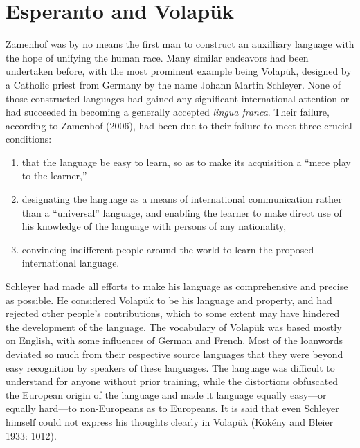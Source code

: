 \section{Esperanto and Volapük}
Zamenhof was by no means the first man to construct an auxilliary language with the hope of unifying the human race.
Many similar endeavors had been undertaken before, with the most prominent example being Volapük, designed by a Catholic priest from Germany by the name Johann Martin Schleyer.
None of those constructed languages had gained any significant international attention or had succeeded in becoming a generally accepted \textit{lingua franca}.
Their failure, according to Zamenhof (2006), had been due to their failure to meet three crucial conditions:

\begin{enumerate}
  \item that the language be easy to learn, so as to make its acquisition a ``mere play to the learner,''
  \item designating the language as a means of international communication rather than a ``universal'' language, and enabling the learner to make direct use of his knowledge of the language with persons of any nationality,
  \item convincing indifferent people around the world to learn the proposed international language.
\end{enumerate}

Schleyer had made all efforts to make his language as comprehensive and precise as possible.
He considered Volapük to be his language and property, and had rejected other people's contributions, which to some extent may have hindered the development of the language.
The vocabulary of Volapük was based mostly on English, with some influences of German and French.
Most of the loanwords deviated so much from their respective source languages that they were beyond easy recognition by speakers of these languages.
The language was difficult to understand for anyone without prior training, while the distortions obfuscated the European origin of the language and made it language equally easy---or equally hard---to non-Europeans as to Europeans.
It is said that even Schleyer himself could not express his thoughts clearly in Volapük
(Kökény and Bleier 1933: 1012).

